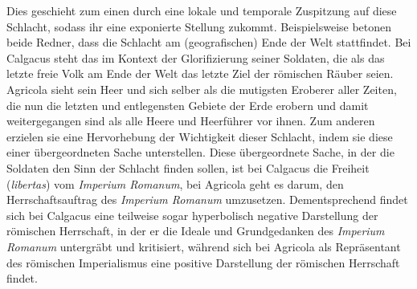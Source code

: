\documentclass[12pt]{article}
\begin{document}
	Dies geschieht zum einen durch eine lokale und temporale Zuspitzung auf diese Schlacht, sodass ihr eine exponierte Stellung zukommt. Beispielsweise betonen beide Redner, dass die Schlacht am (geografischen) Ende der Welt stattfindet. Bei Calgacus steht das im Kontext der Glorifizierung seiner Soldaten, die als das letzte freie Volk am Ende der Welt das letzte Ziel der römischen Räuber seien. Agricola sieht sein Heer und sich selber als die mutigsten Eroberer aller Zeiten, die nun die letzten und entlegensten Gebiete der Erde erobern und damit weitergegangen sind als alle Heere und Heerführer vor ihnen. 
	Zum anderen erzielen sie eine Hervorhebung der Wichtigkeit dieser Schlacht, indem sie  diese einer übergeordneten Sache unterstellen. Diese übergeordnete Sache, in der die Soldaten den Sinn der Schlacht finden sollen, ist bei Calgacus die Freiheit (\textit{libertas}) vom \textit{Imperium Romanum}, bei Agricola geht es darum, den Herrschaftsauftrag des \textit{Imperium Romanum} umzusetzen. 
	Dementsprechend findet sich bei Calgacus eine teilweise sogar hyperbolisch negative Darstellung der römischen Herrschaft, in der er die Ideale und Grundgedanken des \textit{Imperium Romanum} untergräbt und kritisiert, während sich bei Agricola als Repräsentant des römischen Imperialismus eine positive Darstellung der römischen Herrschaft findet.
		
\end{document}
